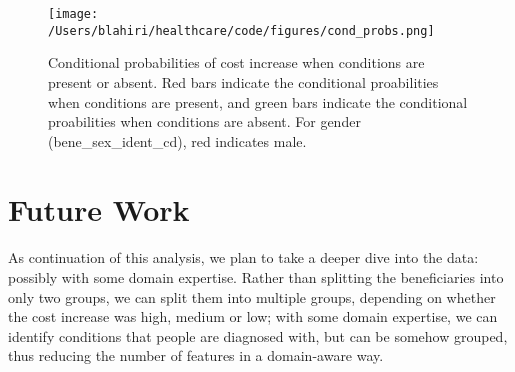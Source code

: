 \begin{figure}[!h]
    \centering
    \texttt{[image: /Users/blahiri/healthcare/code/figures/cond\_probs.png]}
    \caption{\small Conditional probabilities of cost increase when conditions are present or absent. Red bars indicate the conditional proabilities when conditions are present, and green bars indicate the conditional proabilities when conditions are absent. For gender (bene\_sex\_ident\_cd), red indicates male.}
    \label{fig:cond_probs}
\end{figure}

\section{Future Work}
\label{sec:future}
As continuation of this analysis, we plan to take a deeper dive into the data: possibly with some domain expertise. Rather than splitting the beneficiaries into only two groups, we can split them into multiple groups, depending on whether the cost increase was high, medium or low; with some domain expertise, we can identify conditions that people are diagnosed with, but can be somehow grouped, thus reducing the number of features in a domain-aware way.   
